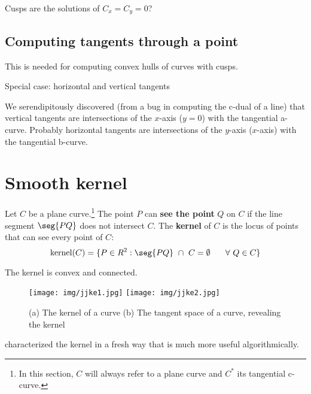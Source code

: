 \documentclass[12pt]{article}
\begin{document}
Cusps are the solutions of $C_x = C_y = 0$?

\subsection{Computing tangents through a point}

This is needed for computing convex hulls of curves with cusps.

\noindent Special case: horizontal and vertical tangents

\noindent We serendipitously discovered (from a bug in computing
	the c-dual of a line) that vertical tangents are intersections
	of the $x$-axis ($y=0$) with the tangential a-curve.
Probably horizontal tangents are intersections of the $y$-axis ($x$-axis)
with the tangential b-curve.

\clearpage


\section{Smooth kernel}
\label{sec:smoothkernel}

\begin{defn2}
Let $C$ be a plane curve.\footnote{In this section, $C$ will always refer 
	to a plane curve and $C^*$ its tangential c-curve.}
The point $P$ can {\bf see the point} $Q$ on $C$
if the line segment $\seg{PQ}$ does not intersect $C$.
The {\bf kernel} of $C$ is the locus of points that can see every
point of $C$:
\[
\mbox{kernel}(C) = \{ P \in R^2: \seg{PQ} \ \cap \ C = \emptyset 
		\hspace{.25in} \forall \ Q \in C \}
\]
\end{defn2}

\begin{lemma}
The kernel is convex and connected.
\end{lemma}

\begin{figure}[h]
\begin{center}
\texttt{[image: img/jjke1.jpg]}
\texttt{[image: img/jjke2.jpg]}
\end{center}
\caption{(a) The kernel of a curve (b) The tangent space of a curve, revealing the kernel}
\label{fig:kernel}
\end{figure}

\noindent \cite{elber02} characterized the kernel in a fresh way that is much more
useful algorithmically.
\end{document}
